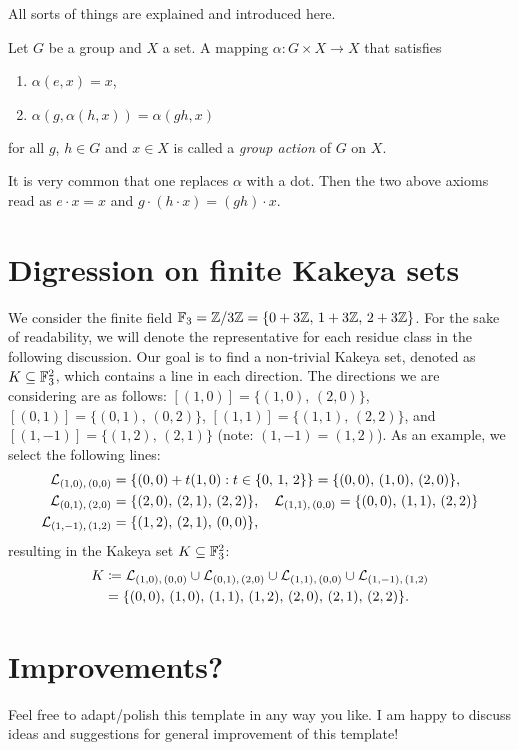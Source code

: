 All sorts of things are explained and introduced here.

\begin{definition}
	Let $G$ be a group and $X$ a set. A mapping $\alpha:G\times X \to X$ that satisfies
	\begin{enumerate}[label=(A\arabic*)]
		\item $\alpha(e,x) = x$,
		\item $\alpha(g,\alpha(h,x))=\alpha(gh,x)$
	\end{enumerate}
	for all $g$, $h \in G$ and $x \in X$ is called a \emph{group action} of $G$ on $X$.
\end{definition}

\begin{remark*}
	It is very common that one replaces $\alpha$ with a dot. Then the two above axioms read as $e\cdot x = x$ and $g\cdot (h \cdot x) = (gh) \cdot x$.
\end{remark*}

\section{Digression on finite Kakeya sets}
\label{sec:kakeya}

\begin{example}\label{ex:kakeya-set}
	We consider the finite field $\mathbb{F}_3 = \mathbb{Z}/3\mathbb{Z} = \{ 0+3\mathbb{Z},\, 1+3\mathbb{Z},\, 2+3\mathbb{Z} \}$. 
	For the sake of readability, we will denote the representative for each residue class in the following discussion. 
	Our goal is to find a non-trivial Kakeya set, denoted as $K \subseteq \mathbb{F}_3^2$, which contains a line in each direction. 
	The directions we are considering are as follows:  $\left[ (1,0) \right] = \{ (1,0),\, (2,0) \}$, 
	$\left[ (0,1) \right] = \{ (0,1),\, (0,2) \}$, $\left[ (1,1) \right] = \{ (1,1),\, (2,2) \}$, and 
	$\left[ (1,-1) \right] = \{ (1,2),\, (2,1) \}$ (note: $(1,-1) = (1,2)$). 
	As an example, we select the following lines:
	\begin{align*}
		\mathcal{L}_{(1,0),\, (0,0)} &= \{ (0,0) + t(1,0) : t \in \{0,\, 1, \, 2\} \} = \{ (0,0),\, (1,0),\, (2,0) \}, \\
		\mathcal{L}_{(0,1),\, (2,0)} &= \{ (2,0),\, (2,1),\, (2,2) \}, \quad \mathcal{L}_{(1,1),\, (0,0)} = \{ (0,0),\, (1,1),\, (2,2) \} \\
		\mathcal{L}_{(1,-1),\, (1,2)} &= \{ (1,2),\, (2,1),\, (0,0) \},
	\end{align*}
	resulting in the Kakeya set $K \subseteq \mathbb{F}_3^2$:
	\begin{align*}
		K &\coloneqq \mathcal{L}_{(1,0),\, (0,0)} \cup \mathcal{L}_{(0,1),\, (2,0)} \cup \mathcal{L}_{(1,1),\, (0,0)} \cup \mathcal{L}_{(1,-1),\, (1,2)} \\
		&= \{ (0,0),\, (1,0),\, (1,1),\, (1,2),\, (2,0),\, (2,1),\, (2,2) \}.
	\end{align*}
\end{example}

\section{Improvements?}
\label{sec:improv}
Feel free to adapt/polish this template in any way you like. I am happy to discuss ideas and suggestions for general improvement of this template!
